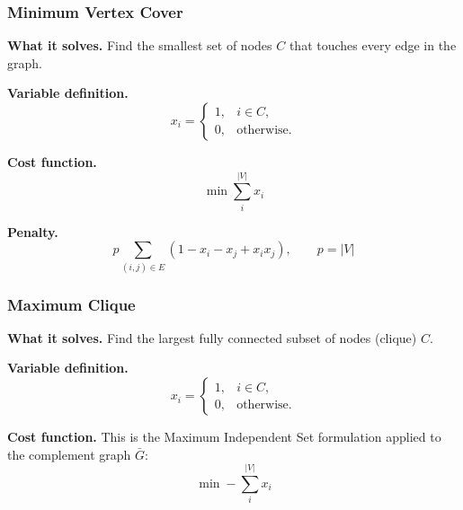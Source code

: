 \newpage

\subsubsection{Minimum Vertex Cover}

\textcolor{Green3}{ \textbf{What it solves.}} Find the smallest set of nodes $C$ that touches every edge in the graph.

\highspace
\textcolor{Green3}{ \textbf{Variable definition.}}
\begin{equation*}
    x_i=
    \begin{cases}
        1, & i\in C,\\
        0, & \text{otherwise}.
    \end{cases}
\end{equation*}

\highspace
\textcolor{Red2}{ \textbf{Cost function.}}
\begin{equation}\label{eq:qubo-min-vertex-cover}
    \min \sum_{i}^{|V|}x_i
\end{equation}

\highspace
\textcolor{Red2}{ \textbf{Penalty.}}
\begin{equation}\label{eq:qubo-min-vertex-cover-penalty}
    p\sum_{(i,j)\in E}
    \left(1-x_i-x_j+x_ix_j\right),
    \qquad p=|V|
\end{equation}

\longline

\subsubsection{Maximum Clique}

\textcolor{Green3}{ \textbf{What it solves.}} Find the largest fully connected subset of nodes (clique) $C$.

\highspace
\textcolor{Green3}{ \textbf{Variable definition.}}
\begin{equation*}
    x_i=
    \begin{cases}
        1, & i\in C,\\
        0, & \text{otherwise}.
    \end{cases}
\end{equation*}

\highspace
\textcolor{Red2}{ \textbf{Cost function.}} This is the Maximum Independent Set formulation applied to the complement graph $\bar{G}$:
\begin{equation}\label{eq:qubo-max-clique}
    \min -\sum_{i}^{|V|}x_i
\end{equation}


